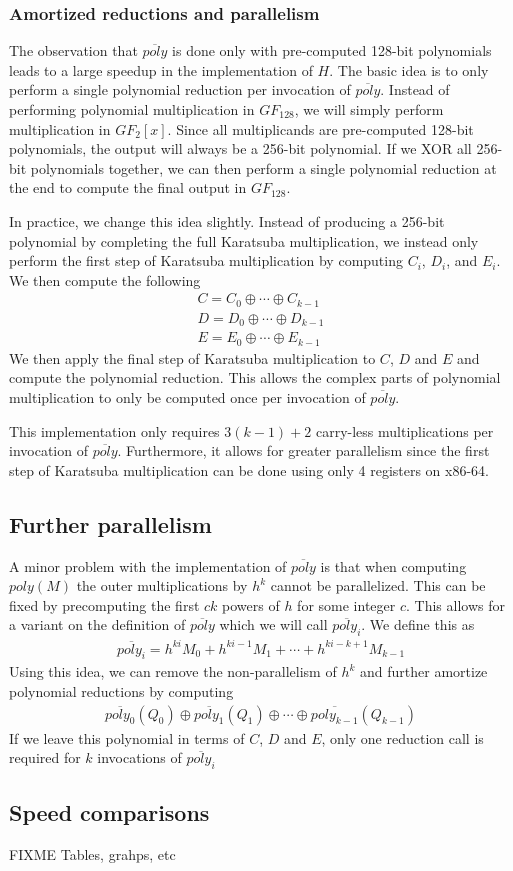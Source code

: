 \documentclass[hctr.tex]{subfiles}
\begin{document}
\subsubsection{Amortized reductions and parallelism}
The observation that $\overline{poly}$ is done only with pre-computed 128-bit polynomials leads to a large speedup in the implementation of $H$. The basic idea is to only perform a single polynomial reduction per invocation of $\overline{poly}$. Instead of performing polynomial multiplication in $GF_{128}$, we will simply perform multiplication in $GF_{2}[x]$. Since all multiplicands are pre-computed 128-bit polynomials, the output will always be a 256-bit polynomial. If we XOR all 256-bit polynomials together, we can then perform a single polynomial reduction at the end to compute the final output in $GF_{128}$.

In practice, we change this idea slightly. Instead of producing a 256-bit polynomial by completing the full Karatsuba multiplication, we instead only perform the first step of Karatsuba multiplication by computing $C_i$, $D_i$, and $E_i$. We then compute the following
\begin{gather*}
       C = C_0 \oplus \cdots \oplus C_{k-1}\\
       D = D_0 \oplus \cdots \oplus D_{k-1}\\
       E = E_0 \oplus \cdots \oplus E_{k-1}
\end{gather*}
We then apply the final step of Karatsuba multiplication to $C$, $D$ and $E$ and compute the polynomial reduction. This allows the complex parts of polynomial multiplication to only be computed once per invocation of $\overline{poly}$.

This implementation only requires $3(k-1) + 2$ carry-less multiplications per invocation of $\overline{poly}$. Furthermore, it allows for greater parallelism since the first step of Karatsuba multiplication can be done using only 4 registers on x86-64.

\subsection{Further parallelism}
A minor problem with the implementation of $\overline{poly}$ is that when computing $poly(M)$ the outer multiplications by $h^{k}$ cannot be parallelized. This can be fixed by precomputing the first $ck$ powers of $h$ for some integer $c$. This allows for a variant on the definition of $\overline{poly}$ which we will call $\overline{poly_i}$. We define this as
\begin{align*}
       \overline{poly_i} = h^{ki}M_0 + h^{ki-1}M_1 + \cdots + h^{ki - k + 1}M_{k-1}
\end{align*}
Using this idea, we can remove the non-parallelism of $h^k$ and further amortize polynomial reductions by computing
\begin{align*}
	\overline{poly_0}(Q_0) \oplus \overline{poly_1}(Q_1) \oplus \cdots \oplus \overline{poly_{k-1}}(Q_{k-1})
\end{align*}
If we leave this polynomial in terms of $C$, $D$ and $E$, only one reduction call is required for $k$ invocations of $\overline{poly_i}$

\subsection{Speed comparisons}
{\color{red} FIXME Tables, grahps, etc}
\end{document}
